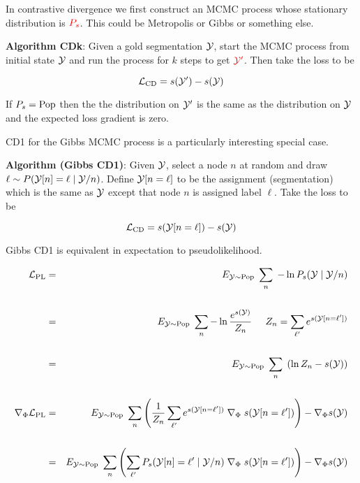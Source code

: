{In contrastive divergence we first construct an MCMC process whose stationary distribution is ${\color{red} P_s}$.  This could be
Metropolis or Gibbs or something else.

\vfill
{\bf Algorithm CDk}: Given a gold segmentation ${\cal Y}$, start the MCMC process from initial state ${\cal Y}$ and run the process for $k$ steps
to get ${\color{red} {\cal Y}'}$.  Then take the loss to be

\vfill
{\color{red} $${\cal L}_{\mathrm{CD}}  = s({\cal Y}') - s({\cal Y})$$}

If $P_s = \mathrm{Pop}$ then the the distribution on ${\cal Y}'$ is the same as the distribution on ${\cal Y}$ and the
expected loss gradient is zero.


CD1 for the Gibbs MCMC process is a particularly interesting special case.

\vfill
{\bf Algorithm (Gibbs CD1)}: Given ${\cal Y}$, select a node $n$ at random and draw {\color{red} $\ell \sim P({\cal Y}[n]=\ell\;| \;{\cal Y}/n)$}. Define {\color{red} ${\cal Y}[n=\ell]$}
to be the assignment (segmentation) which is the same as ${\cal Y}$ except that node $n$ is assigned label $\ell$.  Take the loss to be

\vfill
{\color{red} $${\cal L}_{\mathrm{CD}}  = s({\cal Y}[n=\ell]) - s({\cal Y})$$}


Gibbs CD1 is equivalent in expectation to pseudolikelihood.

{\huge
\begin{eqnarray*}
{\cal L}_{\mathrm{PL}} & = & E_{{\cal Y} \sim \mathrm{Pop}}\;\sum_n \; - \ln P_s({\cal Y}\;|\;{\cal Y}/n) \\
\\
 & = & E_{{\cal Y} \sim \mathrm{Pop}}\;\sum_n -\ln \frac{e^{s({\cal Y})}}{Z_n}\;\;\;\;\;{Z_n = \sum_{\ell'} e^{s({\cal Y}[n=\ell'])}} \\
\\
& = & E_{{\cal Y} \sim \mathrm{Pop}}\;\sum_n\; \left(\ln Z_n - s({\cal Y})\right) \\
\\
\nabla_\Phi {\cal L}_{\mathrm{PL}} & = & E_{{\cal Y} \sim \mathrm{Pop}}\;\sum_n \left(\frac{1}{Z_n} \sum_{\ell'} e^{s({\cal Y}[n=\ell'])} \; \nabla_\Phi\;s({\cal Y}[n=\ell'])\right) - \nabla_\Phi s({\cal Y}) \\
\\
& = & E_{{\cal Y} \sim \mathrm{Pop}}\;\sum_n \left(\sum_{\ell'} P_s({\cal Y}[n]=\ell'\;|\;{\cal Y}/n) \; \nabla_\Phi\;s({\cal Y}[n=\ell'])\right) - \nabla_\Phi s({\cal Y})
\end{eqnarray*}
}

}
